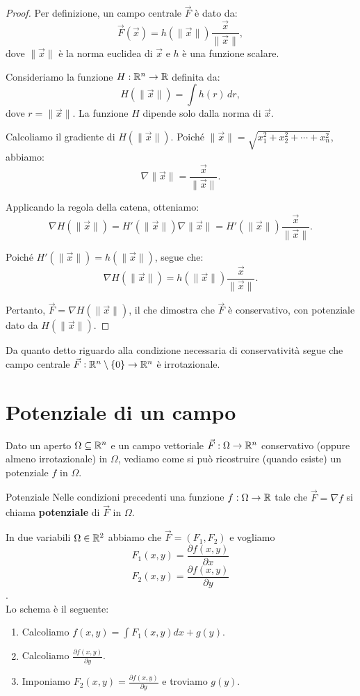 \begin{proof}
  Per definizione, un campo centrale $\vec F$ è dato da:
  $$ \vec F(\vec{x}) = h(\|\vec{x}\|) \frac{\vec{x}}{\|\vec{x}\|}, $$
  dove $\|\vec{x}\|$ è la norma euclidea di $\vec{x}$ e $h$ è una funzione scalare.

  Consideriamo la funzione $H: \mathbb{R}^n \rightarrow \mathbb{R}$ definita da:
  $$ H(\|\vec{x}\|) = \int h(r) \, dr, $$
  dove $r = \|\vec{x}\|$. La funzione $H$ dipende solo dalla norma di $\vec{x}$.

  Calcoliamo il gradiente di $H(\|\vec{x}\|)$. Poiché $\|\vec{x}\| = \sqrt{x_1^2 + x_2^2 + \cdots + x_n^2}$, abbiamo:
  $$ \nabla \|\vec{x}\| = \frac{\vec{x}}{\|\vec{x}\|}. $$

  Applicando la regola della catena, otteniamo:
  $$ \nabla H(\|\vec{x}\|) = H'(\|\vec{x}\|) \nabla \|\vec{x}\| = H'(\|\vec{x}\|) \frac{\vec{x}}{\|\vec{x}\|}. $$

  Poiché $H'(\|\vec{x}\|) = h(\|\vec{x}\|)$, segue che:
  $$ \nabla H(\|\vec{x}\|) = h(\|\vec{x}\|) \frac{\vec{x}}{\|\vec{x}\|}. $$

  Pertanto, $\vec F = \nabla H(\|\vec{x}\|)$, il che dimostra che $\vec F$ è conservativo, con potenziale dato da $H(\|\vec{x}\|)$.
\end{proof}



\begin{osservazione}{}
  Da quanto detto riguardo alla condizione necessaria di conservatività segue che campo centrale $\vec F: \mathbb{R}^n \setminus \{0\} \rightarrow \mathbb{R}^n$ è irrotazionale.
\end{osservazione}

\section{Potenziale di un campo}

Dato un aperto $\Omega \subseteq \mathbb{R}^n$ e un campo vettoriale $\vec F: \Omega \rightarrow \mathbb{R}^n$ conservativo (oppure almeno irrotazionale) in $\Omega$, vediamo come si può ricostruire (quando esiste) un potenziale $f$ in $\Omega$.

\begin{definizione}{Potenziale}
  Nelle condizioni precedenti una funzione $f: \Omega \rightarrow \mathbb{R}$ tale che $\vec F = \nabla f$ si chiama \textbf{potenziale} di $\vec F$ in $\Omega$.
\end{definizione}

In due variabili $\Omega \in \mathbb{R}^2$ abbiamo che $\vec F = (F_1, F_2)$ e vogliamo\\
$$F_1(x,y) = \frac{\partial f(x,y)}{\partial{x}} $$
$$F_2(x,y) = \frac{\partial f(x,y)}{\partial{y}} $$.\\
Lo schema è il seguente:
\begin{enumerate}
\item Calcoliamo $f(x,y) = \int F_1(x,y)dx + g(y)$.
\item Calcoliamo $\frac{\partial f(x,y)}{\partial{y}}$.
\item Imponiamo $F_2(x,y)=\frac{\partial f(x,y)}{\partial{y}}$ e troviamo $g(y)$.
\end{enumerate}

